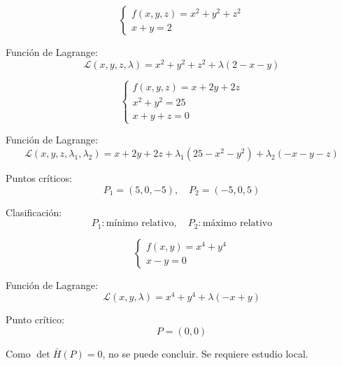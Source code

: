 \begin{Ejer}

\[
\begin{cases}
f(x,y,z)=x^2+y^2+z^2\\
x+y=2
\end{cases}
\]

Funci\'on de Lagrange:
\[
\mathcal{L}(x,y,z,\lambda)=x^2+y^2+z^2+\lambda(2-x-y)
\]
\end{Ejer}
\begin{Ejer}

\[
\begin{cases}
f(x,y,z)=x+2y+2z\\
x^2+y^2=25\\
x+y+z=0
\end{cases}
\]

Funci\'on de Lagrange:
\[
\mathcal{L}(x,y,z,\lambda_1,\lambda_2)=x+2y+2z+
\lambda_1(25-x^2-y^2)+\lambda_2(-x-y-z)
\]

Puntos cr\'iticos:
\[
P_1=(5,0,-5),\quad
P_2=(-5,0,5)
\]

Clasificaci\'on:
\[
P_1:\text{m\'inimo relativo},\quad
P_2:\text{m\'aximo relativo}
\]
\end{Ejer}
\begin{Ejer}

\[
\begin{cases}
f(x,y)=x^4+y^4\\
x-y=0
\end{cases}
\]

Funci\'on de Lagrange:
\[
\mathcal{L}(x,y,\lambda)=x^4+y^4+\lambda(-x+y)
\]

Punto cr\'itico:
\[
P=(0,0)
\]

Como $\det\bar H(P)=0$, no se puede concluir. Se requiere estudio local.
\end{Ejer}

